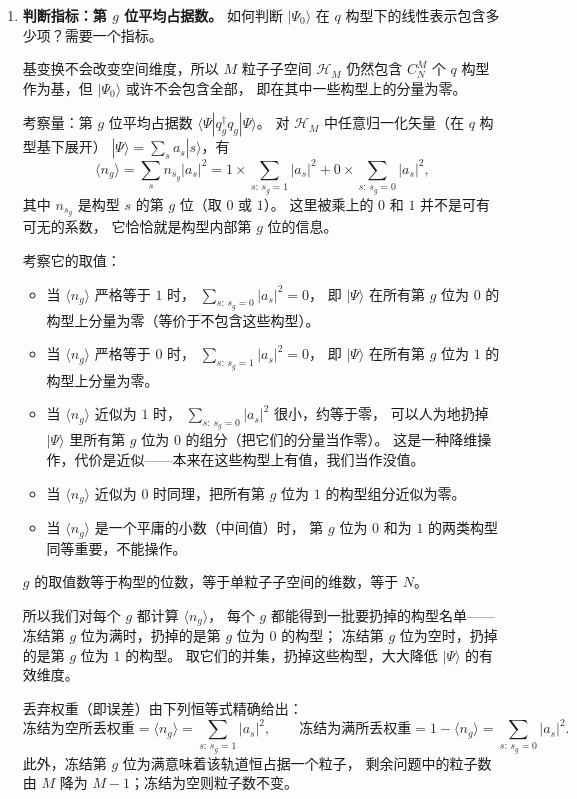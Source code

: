 \documentclass[11pt]{ctexart}
\begin{document}
\begin{enumerate}[leftmargin=2em, itemsep=0.8em]
\item \textbf{判断指标：第 $g$ 位平均占据数。}
如何判断 $|\Psi_0\rangle$ 在 $q$ 构型下的线性表示包含多少项？需要一个指标。

基变换不会改变空间维度，所以 $M$ 粒子子空间 $\mathcal{H}_M$ 仍然包含
$C_N^M$ 个 $q$ 构型作为基，但 $|\Psi_0\rangle$ 或许不会包含全部，
即在其中一些构型上的分量为零。

考察量：第 $g$ 位平均占据数 $\langle\Psi|q_g^{\dagger}q_g|\Psi\rangle$。
对 $\mathcal{H}_M$ 中任意归一化矢量（在 $q$ 构型基下展开）
$|\Psi\rangle=\sum_s a_s|s\rangle$，有
\[
\langle n_g\rangle
=\sum_s n_{s_g}|a_s|^2
=1\times\sum_{s:\,s_g=1}|a_s|^2
+0\times\sum_{s:\,s_g=0}|a_s|^2 ,
\]
其中 $n_{s_g}$ 是构型 $s$ 的第 $g$ 位（取 $0$ 或 $1$）。
这里被乘上的 $0$ 和 $1$ 并不是可有可无的系数，
它恰恰就是构型内部第 $g$ 位的信息。

考察它的取值：
\begin{itemize}[leftmargin=2em, itemsep=0.2em]
\item 当 $\langle n_g\rangle$ 严格等于 $1$ 时，
$\sum_{s:\,s_g=0}|a_s|^2=0$，
即 $|\Psi\rangle$ 在所有第 $g$ 位为 $0$ 的构型上分量为零（等价于不包含这些构型）。
\item 当 $\langle n_g\rangle$ 严格等于 $0$ 时，
$\sum_{s:\,s_g=1}|a_s|^2=0$，
即 $|\Psi\rangle$ 在所有第 $g$ 位为 $1$ 的构型上分量为零。
\item 当 $\langle n_g\rangle$ 近似为 $1$ 时，
$\sum_{s:\,s_g=0}|a_s|^2$ 很小，约等于零，
可以人为地扔掉 $|\Psi\rangle$ 里所有第 $g$ 位为 $0$ 的组分（把它们的分量当作零）。
这是一种降维操作，代价是近似——本来在这些构型上有值，我们当作没值。
\item 当 $\langle n_g\rangle$ 近似为 $0$ 时同理，把所有第 $g$ 位为 $1$ 的构型组分近似为零。
\item 当 $\langle n_g\rangle$ 是一个平庸的小数（中间值）时，
第 $g$ 位为 $0$ 和为 $1$ 的两类构型同等重要，不能操作。
\end{itemize}

$g$ 的取值数等于构型的位数，等于单粒子子空间的维数，等于 $N$。

所以我们对每个 $g$ 都计算 $\langle n_g\rangle$，
每个 $g$ 都能得到一批要扔掉的构型名单——
冻结第 $g$ 位为满时，扔掉的是第 $g$ 位为 $0$ 的构型；
冻结第 $g$ 位为空时，扔掉的是第 $g$ 位为 $1$ 的构型。
取它们的并集，扔掉这些构型，大大降低 $|\Psi\rangle$ 的有效维度。

丢弃权重（即误差）由下列恒等式精确给出：
\[
\text{冻结为空所丢权重}=\langle n_g\rangle=\sum_{s:\,s_g=1}|a_s|^2 ,
\qquad
\text{冻结为满所丢权重}=1-\langle n_g\rangle=\sum_{s:\,s_g=0}|a_s|^2 .
\]
此外，冻结第 $g$ 位为满意味着该轨道恒占据一个粒子，
剩余问题中的粒子数由 $M$ 降为 $M-1$；冻结为空则粒子数不变。


\end{enumerate}
\end{document}
